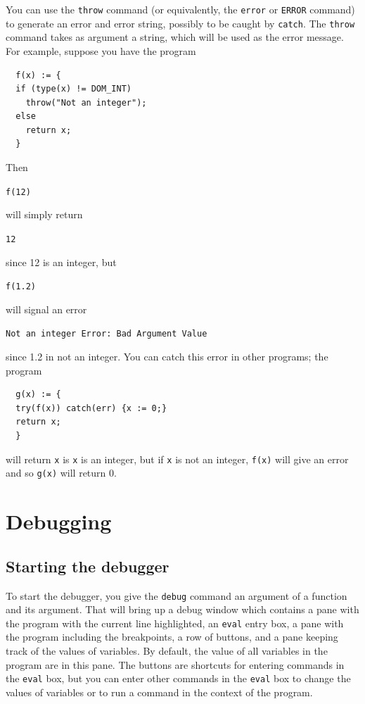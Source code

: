 \documentclass[a4paper,11pt]{book}
\begin{document}
You can use the \texttt{throw} command (or equivalently,
the \texttt{error} or \texttt{ERROR}
command) to generate an error and error string, possibly to be caught
by \texttt{catch}.  The \texttt{throw} command takes as argument a
string, which will be used as the error message.  For example, suppose
you have the program
\begin{verbatim}
  f(x) := {
  if (type(x) != DOM_INT)
    throw("Not an integer");
  else
    return x;
  }
\end{verbatim}
Then
\begin{center}
  {\tt f(12)}
\end{center}
will simply return
\begin{center}
  {\tt 12}
\end{center}
since 12 is an integer, but
\begin{center}
  {\tt f(1.2)}
\end{center}
will signal an error
\begin{center}
  {\tt Not an integer Error: Bad Argument Value}
\end{center}
since 1.2 in not an integer.  You can catch this error in other
programs; the program
\begin{verbatim}
  g(x) := {
  try(f(x)) catch(err) {x := 0;}
  return x;
  }
\end{verbatim}
will return \texttt{x} is \texttt{x} is an integer, but if \texttt{x}
is not an integer, \texttt{f(x)} will give an error and so
\texttt{g(x)} will return 0.
    
\section{Debugging}
\label{sec:debug}

\subsection{Starting the debugger}

To start the debugger, you give the \texttt{debug} command an argument
of a function and its argument.  That will bring up a debug window
which contains a pane with the program with the current line highlighted, an
\texttt{eval} entry box, a pane with the program including the
breakpoints, a row of buttons, and a pane keeping track of
the values of variables.  By default, the value of all variables in
the program are in this pane.  The buttons are shortcuts
for entering commands in the \texttt{eval} box, but you can enter
other commands in the \texttt{eval} box to change the values of
variables or to run a command in the context of the program.
\end{document}
